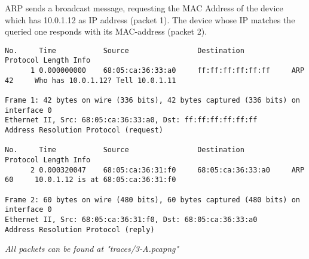 ARP sends a broadcast message, requesting the MAC Address of the device which has 10.0.1.12 as IP address (packet 1). The device whose IP matches the queried one responds with its MAC-address (packet 2). \\
\begin{lstlisting}
No.     Time           Source                Destination           Protocol Length Info
      1 0.000000000    68:05:ca:36:33:a0     ff:ff:ff:ff:ff:ff     ARP      42     Who has 10.0.1.12? Tell 10.0.1.11

Frame 1: 42 bytes on wire (336 bits), 42 bytes captured (336 bits) on interface 0
Ethernet II, Src: 68:05:ca:36:33:a0, Dst: ff:ff:ff:ff:ff:ff
Address Resolution Protocol (request)

No.     Time           Source                Destination           Protocol Length Info
      2 0.000320047    68:05:ca:36:31:f0     68:05:ca:36:33:a0     ARP      60     10.0.1.12 is at 68:05:ca:36:31:f0

Frame 2: 60 bytes on wire (480 bits), 60 bytes captured (480 bits) on interface 0
Ethernet II, Src: 68:05:ca:36:31:f0, Dst: 68:05:ca:36:33:a0
Address Resolution Protocol (reply)
\end{lstlisting}
\textit{All packets can be found at "traces/3-A.pcapng"}